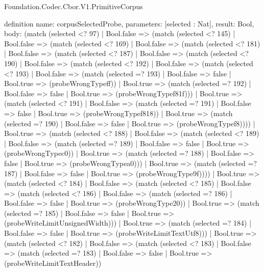 \begin{lexlean}{Foundation.Codec.Cbor.V1.PrimitiveCorpus}
\begin{semanticmodule}
definition{
  name: corpusSelectedProbe,
  parameters: [selected : Nat],
  result: Bool,
  body: (match (selected <? 97)
    | Bool.false => (match (selected <? 145)
      | Bool.false => (match (selected <? 169)
        | Bool.false => (match (selected <? 181)
          | Bool.false => (match (selected <? 187)
            | Bool.false => (match (selected <? 190)
              | Bool.false => (match (selected <? 192)
                | Bool.false => (match (selected <? 193)
                  | Bool.false => (match (selected =? 193)
                    | Bool.false => false
                    | Bool.true => (probeWrongTypeff))
                  | Bool.true => (match (selected =? 192)
                    | Bool.false => false
                    | Bool.true => (probeWrongTypef81f)))
                | Bool.true => (match (selected <? 191)
                  | Bool.false => (match (selected =? 191)
                    | Bool.false => false
                    | Bool.true => (probeWrongTypef818))
                  | Bool.true => (match (selected =? 190)
                    | Bool.false => false
                    | Bool.true => (probeWrongTypef8))))
              | Bool.true => (match (selected <? 188)
                | Bool.false => (match (selected <? 189)
                  | Bool.false => (match (selected =? 189)
                    | Bool.false => false
                    | Bool.true => (probeWrongTypec0))
                  | Bool.true => (match (selected =? 188)
                    | Bool.false => false
                    | Bool.true => (probeWrongTypea0)))
                | Bool.true => (match (selected =? 187)
                  | Bool.false => false
                  | Bool.true => (probeWrongType9f))))
            | Bool.true => (match (selected <? 184)
              | Bool.false => (match (selected <? 185)
                | Bool.false => (match (selected <? 186)
                  | Bool.false => (match (selected =? 186)
                    | Bool.false => false
                    | Bool.true => (probeWrongType20))
                  | Bool.true => (match (selected =? 185)
                    | Bool.false => false
                    | Bool.true => (probeWriteLimitUnsignedWidth)))
                | Bool.true => (match (selected =? 184)
                  | Bool.false => false
                  | Bool.true => (probeWriteLimitTextUtf8)))
              | Bool.true => (match (selected <? 182)
                | Bool.false => (match (selected <? 183)
                  | Bool.false => (match (selected =? 183)
                    | Bool.false => false
                    | Bool.true => (probeWriteLimitTextHeader))
}
\end{semanticmodule}
\end{lexlean}

